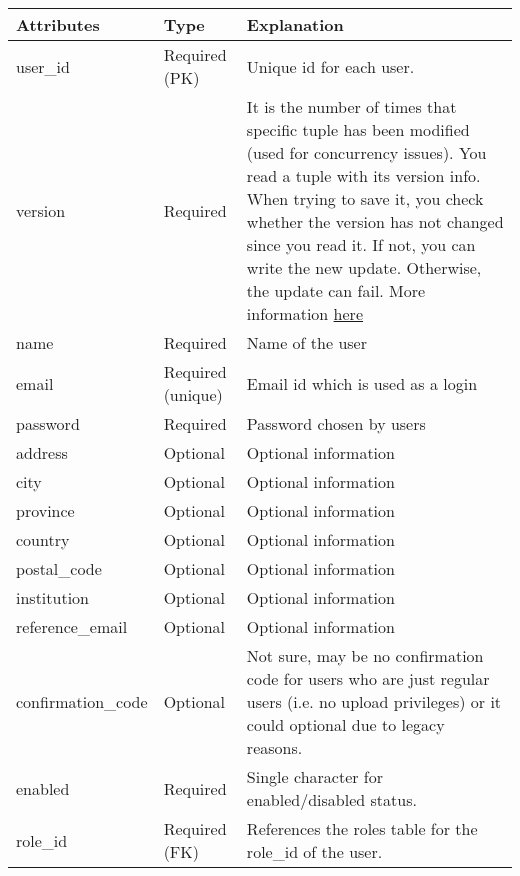 \documentclass[letterpaper,10pt,english]{sphinxmanual}
\begin{document}
\begin{tabulary}{\linewidth}{|L|L|L|}
\hline
\textbf{
Attributes
} & \textbf{
Type
} & \textbf{
Explanation
}\\\hline

user\_id
 & 
Required (PK)
 & 
Unique id for each user.
\\\hline

version
 & 
Required
 & 
It is the number of times that specific tuple has been modified
(used for concurrency issues). You read a tuple with its version info.
When trying to save it, you check whether the version has not changed
since you read it. If not, you can write the new update. Otherwise,
the update can fail. More information \href{http://wiki.cs.rpi.edu/trac/metpetdb/wiki/Versioning}{here}
\\\hline

name
 & 
Required
 & 
Name of the user
\\\hline

email
 & 
Required (unique)
 & 
Email id which is used as a login
\\\hline

password
 & 
Required
 & 
Password chosen by users
\\\hline

address
 & 
Optional
 & 
Optional information
\\\hline

city
 & 
Optional
 & 
Optional information
\\\hline

province
 & 
Optional
 & 
Optional information
\\\hline

country
 & 
Optional
 & 
Optional information
\\\hline

postal\_code
 & 
Optional
 & 
Optional information
\\\hline

institution
 & 
Optional
 & 
Optional information
\\\hline

reference\_email
 & 
Optional
 & 
Optional information
\\\hline

confirmation\_code
 & 
Optional
 & 
Not sure, may be no confirmation code for users who are just
regular users (i.e. no upload privileges) or it could  optional
due to legacy reasons.
\\\hline

enabled
 & 
Required
 & 
Single character for enabled/disabled status.
\\\hline

role\_id
 & 
Required (FK)
 & 
References the roles table for the role\_id of the user.
\\\hline
\end{tabulary}
\end{document}
